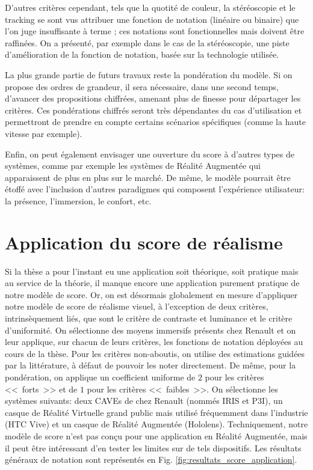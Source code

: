 	\par D'autres critères cependant, tels que la quotité de couleur, la stéréoscopie et le tracking se sont vus attribuer une fonction de notation (linéaire ou binaire) que l'on juge insuffisante à terme ; ces notations sont fonctionnelles mais doivent être raffinées. On a présenté, par exemple dans le cas de la stéréoscopie, une piste d'amélioration de la fonction de notation, basée sur la technologie utilisée.
	
	\par La plus grande partie de futurs travaux reste la pondération du modèle. Si on propose des ordres de grandeur, il sera nécessaire, dans une second temps, d'avancer des propositions chiffrées, amenant plus de finesse pour départager les critères. Ces pondérations chiffrés seront très dépendantes du cas d'utilisation et permettront de prendre en compte certains scénarios spécifiques (comme la haute vitesse par exemple).
	
	\par Enfin, on peut également envisager une ouverture du score à d'autres types de systèmes, comme par exemple les systèmes de Réalité Augmentée qui apparaissent de plus en plus sur le marché. De même, le modèle pourrait être étoffé avec l'inclusion d'autres paradigmes qui composent l'expérience utilisateur: la présence, l'immersion, le confort, etc.

\section*{Application du score de réalisme}
\par Si la thèse a pour l'instant eu une application soit théorique, soit pratique mais au service de la théorie, il manque encore une application purement pratique de notre modèle de score. Or, on est désormais globalement en mesure d'appliquer notre modèle de score de réalisme visuel, à l'exception de deux critères, intrinsèquement liés, que sont le critère de contraste et luminance et le critère d'uniformité. On sélectionne des moyens immersifs présents chez Renault et on leur applique, sur chacun de leurs critères, les fonctions de notation déployées au cours de la thèse. Pour les critères non-aboutis, on utilise des estimations guidées par la littérature, à défaut de pouvoir les noter directement. De même, pour la pondération, on applique un coefficient uniforme de $2$ pour les critères <<~forts~>> et de $1$ pour les critères <<~faibles~>>. On sélectionne les systèmes suivants: deux CAVEs de chez Renault (nommés IRIS et P3I), un casque de Réalité Virtuelle grand public mais utilisé fréquemment dans l'industrie (HTC Vive) et un casque de Réalité Augmentée (Hololens). Techniquement, notre modèle de score n'est pas conçu pour une application en Réalité Augmentée, mais il peut être intéressant d'en tester les limites sur de tels dispositifs. Les résultats généraux de notation sont représentés en Fig. \ref{fig:resultats_score_application}.

